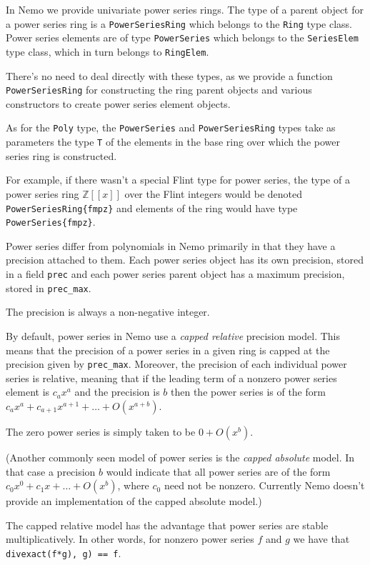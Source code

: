 \documentclass[a4paper,10pt]{article}
\newcommand{\Z}{\mathbb{Z}}
\newcommand{\code}{\lstinline}
\begin{document}
In Nemo we provide univariate power series rings. The type of a parent object for
a power series ring is a \code{PowerSeriesRing} which belongs to the \code{Ring}
type class. Power series elements are of type \code{PowerSeries} which belongs to
the \code{SeriesElem} type class, which in turn belongs to \code{RingElem}.

There's no need to deal directly with these types, as we provide a function
\code{PowerSeriesRing} for constructing the ring parent objects and various
constructors to create power series element objects.

As for the \code{Poly} type, the \code{PowerSeries} and \code{PowerSeriesRing}
types take as parameters the type \code{T} of the elements in the base ring
over which the power series ring is constructed.

For example, if there wasn't a special Flint type for power series, the type of
a power series ring $\Z[[x]]$ over the Flint integers would be denoted
\code|PowerSeriesRing{fmpz}| and elements of the ring would have type
\code|PowerSeries{fmpz}|.

Power series differ from polynomials in Nemo primarily in that they have a
precision attached to them. Each power series object has its own precision,
stored in a field \code{prec} and each power series parent object has a
maximum precision, stored in \code{prec_max}.

The precision is always a non-negative integer.

By default, power series in Nemo use a \emph{capped relative} precision model.
This means that the precision of a power series in a given ring is capped at
the precision given by \code{prec_max}. Moreover, the precision of each 
individual power series is relative, meaning that if the leading term of
a nonzero power series element is $c_ax^a$ and the precision is $b$ then the
power series is of the form $c_ax^a + c_{a+1}x^{a+1} + \ldots + O(x^{a + b})$.

The zero power series is simply taken to be $0 + O(x^b)$.

(Another commonly seen model of power series is the \emph{capped absolute}
model. In that case a precision $b$ would indicate that all power series are
of the form $c_0x^0 + c_1x + \ldots + O(x^b)$, where $c_0$ need not be
nonzero. Currently Nemo doesn't provide an implementation of the capped
absolute model.)

The capped relative model has the advantage that power series are stable
multiplicatively. In other words, for nonzero power series $f$ and $g$ we
have that \code{divexact(f*g), g) == f}.
\end{document}
